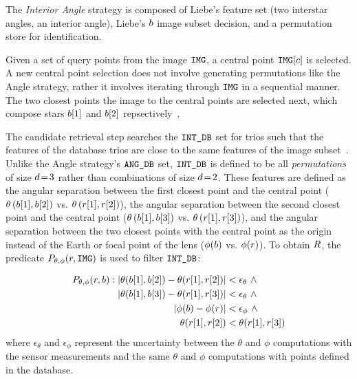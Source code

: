 The \textit{Interior Angle} strategy is composed of Liebe's feature set (two interstar angles, an interior angle), Liebe's $b$ image subset decision, and a permutation store for identification.

Given a set of query points from the image $\texttt{IMG}$, a central point $\texttt{IMG}[c]$ is selected.
A new central point selection does not involve generating permutations like the Angle strategy, rather it involves iterating through $\texttt{IMG}$ in a sequential manner.
The two closest points the image to the central points are selected next, which compose stars $b[1]$ and $b[2]$ repsectively~\cite{liebe:starTrackersAttitudeDetermination}.

The candidate retrieval step searches the $\texttt{INT\_DB}$ set for trios such that the features of the database trios are close to the same features of the image subset~\cite{bratt:analysisStarIdentification}.
Unlike the Angle strategy's $\texttt{ANG\_DB}$ set, $\texttt{INT\_DB}$ is defined to be all \textit{permutations} of size $d\!=\! 3$ rather than combinations of size $d\!=\! 2$.
These features are defined as the angular separation between the first closest point and the central point ($\theta\left(b[1], b[2]\right)$ vs. $ \theta\left(r[1], r[2]\right)$), the angular separation between the second closest point and the central point ($\theta\left(b[1], b[3]\right) $ vs. $\theta\left(r[1], r[3]\right)$), and the angular separation between the two closest points with the central point as the origin instead of the Earth or focal point of the lens ($\phi(b) $ vs. $ \phi(r)$).
To obtain $R$, the predicate $P_{\theta, \phi}(r, \texttt{IMG})$ is used to filter $\texttt{INT\_DB}$:

\begin{equation}
    \begin{aligned}
        P_{\theta, \phi} (\candidateset, \imagesubset): \left\lvert \theta(\vv{\imagesubset[1]}, \vv{\imagesubset[2]}) - \theta(\vv{\candidateset[1]}, \vv{\candidateset[2]})\right\rvert
        &< \epsilon_{\theta} \ \land \\ \left\lvert \theta(\vv{\imagesubset[1]}, \vv{\imagesubset[3]}) - \theta(\vv{\candidateset[1]}, 
        \vv{\candidateset[3]})\right\rvert &< \epsilon_{\theta} \ \land \\ \left\lvert \phi(\imagesubset) - \phi(\candidateset)\right\rvert &<  
        \epsilon_\phi \ \land \\\theta(\vv{\candidateset[1]}, \vv{\candidateset[2]}) &< \theta(\vv{\candidateset[1]}, \vv{\candidateset[3]})
    \end{aligned}
\end{equation}
where $\epsilon_{\theta}$ and $\epsilon_{\phi}$ represent the uncertainty between the $\theta$ and $\phi$ computations with the sensor measurements and the same $\theta$ and $\phi$ computations with points defined in the database.

